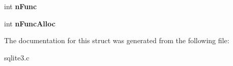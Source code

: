 \begin{DoxyCompactItemize}
\item 
\hypertarget{struct_agg_info_a5bfde7ca00d28da6edbda523ab038e38}{int {\bfseries n\-Func}}\label{struct_agg_info_a5bfde7ca00d28da6edbda523ab038e38}

\item 
\hypertarget{struct_agg_info_a97c3bcfc404c3b328242c7698adacd05}{int {\bfseries n\-Func\-Alloc}}\label{struct_agg_info_a97c3bcfc404c3b328242c7698adacd05}

\end{DoxyCompactItemize}


The documentation for this struct was generated from the following file\-:\begin{DoxyCompactItemize}
\item 
sqlite3.\-c\end{DoxyCompactItemize}
